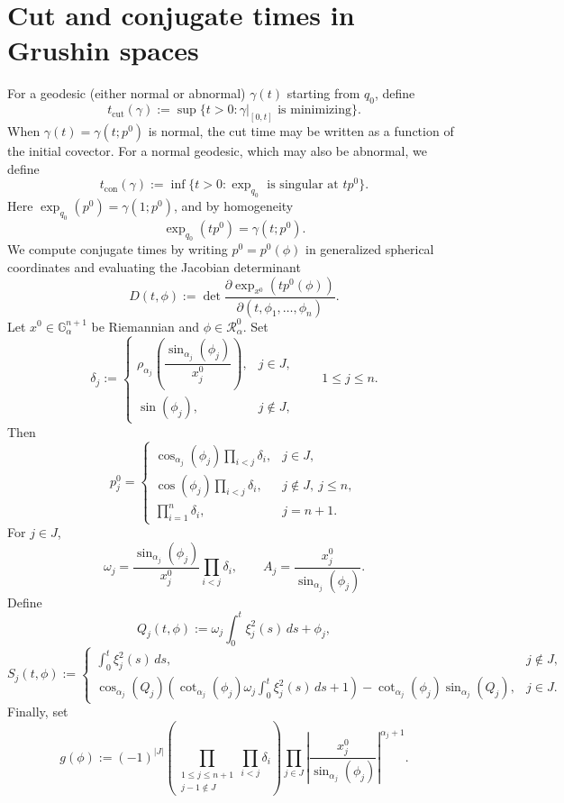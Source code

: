 \documentclass[12pt]{amsart}
\numberwithin{equation}{section}
\theoremstyle{plain}
\theoremstyle{definition}
\theoremstyle{remark}
\begin{document}
\section{Cut and conjugate times in Grushin spaces}
\label{s.CutConjGrushin}
For a geodesic (either normal or abnormal) \(\gamma(t)\) starting from \(q_0\), define
\[
    t_{\operatorname{cut}}(\gamma)
    :=
    \sup\{t>0:\gamma|_{[0,t]}\text{ is minimizing}\}.
\]
When $\gamma(t)=\gamma(t;p^0)$ is normal, the cut time may be written as a function of the initial covector. For a normal geodesic, which may also be abnormal, we define
\[
    t_{\operatorname{con}}(\gamma)
    :=
    \inf\{t>0:\exp_{q_0}\text{ is singular at }tp^0\}.
\]
Here \(\exp_{q_0}(p^0)=\gamma(1;p^0)\), and by homogeneity
\[
    \exp_{q_0}(tp^0)=\gamma(t;p^0).
\]
We compute conjugate times by writing \(p^0=p^0(\phi)\) in generalized spherical
coordinates and evaluating the Jacobian determinant
\[
    D(t,\phi)
    :=
    \det \frac{\partial \exp_{x^0}(tp^0(\phi))}{\partial(t,\phi_1,\ldots,\phi_n)}.
\]
Let \(x^0\in\mathbb G^{n+1}_\alpha\) be Riemannian and
\(\phi\in\mathcal R_\alpha^0\). Set
\begin{equation}\label{delta}
    \delta_j
    :=
    \begin{cases}
        \rho_{\alpha_j}\left(\dfrac{\sin_{\alpha_j}(\phi_j)}{x_j^0}\right),
         & j\in J,    \\[2mm]
        \sin(\phi_j),
         & j\notin J,
    \end{cases}
    \qquad 1\leq j\leq n.
\end{equation}
Then
\[
    p_j^0
    =
    \begin{cases}
        \cos_{\alpha_j}(\phi_j)\prod_{i<j}\delta_i,
         & j\in J,              \\[2mm]
        \cos(\phi_j)\prod_{i<j}\delta_i,
         & j\notin J,\ j\leq n, \\[2mm]
        \prod_{i=1}^n\delta_i,
         & j=n+1.
    \end{cases}
\]
For \(j\in J\),
\[
    \omega_j
    =
    \frac{\sin_{\alpha_j}(\phi_j)}{x_j^0}
    \prod_{i<j}\delta_i,
    \qquad
    A_j
    =
    \frac{x_j^0}{\sin_{\alpha_j}(\phi_j)}.
\]
Define
\begin{equation}\label{e.Qj}
    Q_j(t,\phi)
    :=
    \omega_j\int_0^t\xi_j^2(s)\,ds+\phi_j,
\end{equation}
\[
    S_j(t,\phi)
    :=
    \begin{cases}
        \displaystyle \int_0^t\xi_j^2(s)\,ds,
         & j\notin J, \\[3mm]
        \displaystyle
        \cos_{\alpha_j}(Q_j)
        \left(
        \cot_{\alpha_j}(\phi_j)\omega_j
        \int_0^t\xi_j^2(s)\,ds
        +1
        \right)
        -
        \cot_{\alpha_j}(\phi_j)\sin_{\alpha_j}(Q_j),
         & j\in J.
    \end{cases}
\]
Finally, set
\begin{equation}\label{e.gphi}
    g(\phi)
    :=
        (-1)^{|J|}
    \left(
    \prod_{\substack{1\leq j\leq n+1\\ j-1\notin J}}
    \prod_{i<j}\delta_i
    \right)
    \prod_{j\in J}
    \left|
    \frac{x_j^0}{\sin_{\alpha_j}(\phi_j)}
    \right|^{\alpha_j+1}.
\end{equation}
\end{document}

